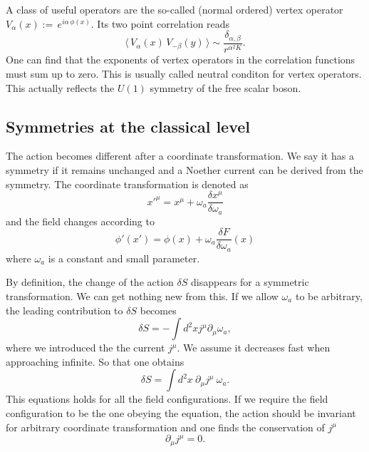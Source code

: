 \documentclass[submission, PhysLectNotes]{SciPost}
\begin{document}
A class of useful operators are the so-called (normal ordered) vertex operator $V_{\alpha}(x) :=\, e^{i\alpha\,\phi(x)}$. Its two point correlation reads
\begin{equation}
	\langle\, V_\alpha(x)\, V_{-\beta}(y)\, \rangle \sim \frac{\delta_{\alpha,\beta}}{r^{\alpha^2 K}}.
\end{equation}
One can find that the exponents of vertex operators in the correlation functions must sum up to zero. This is usually called neutral conditon for vertex operators. This actually reflects the $U(1)$ symmetry of the free scalar boson. 





\subsection{Symmetries at the classical level}
The action becomes different after a coordinate transformation. We say it has a symmetry if it remains unchanged and a Noether current can be derived from the symmetry. The coordinate transformation is denoted as
\begin{equation}
    x'^\mu = x^\mu + \omega_a \frac{\delta x^\mu}{\delta \omega_a}
\end{equation}
and the field changes according to
\begin{equation}
    \phi'(x') = \phi(x) + \omega_a \frac{\delta F}{\delta \omega_a}(x)
\end{equation}
where $\omega_a$ is a constant and small parameter.

By definition, the change of the action $\delta S$ disappears for a symmetric transformation. We can get nothing new from this. If we allow $\omega_a$ to be arbitrary, the leading contribution to $\delta S$ becomes
\begin{equation}
    \delta S = -\int d^2x j^\mu \partial_\mu \omega_a,
\end{equation}
where we introduced the the current $j^\mu$. We assume it decreases fast when approaching infinite. So that one obtains
\begin{equation}
    \delta S = \int d^2x\ \partial_\mu j^\mu \ \omega_a.
\end{equation}
This equations holds for all the field configurations. If we require the field configuration to be the one obeying the equation, the action should be invariant for arbitrary coordinate transformation and one finds the conservation of $j^\mu$
\begin{equation}
    \partial_\mu j^\mu = 0.
\end{equation}
\end{document}
